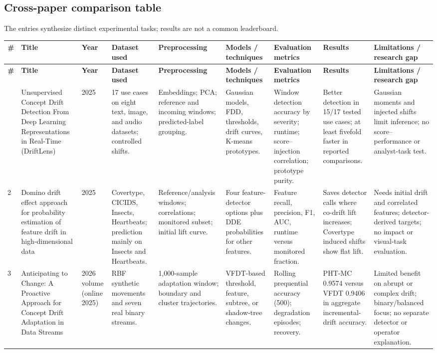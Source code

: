 \documentclass[10pt,a4paper]{article}
\renewcommand{\arraystretch}{1.1}
\begin{document}
\clearpage
\begin{landscape}
\section*{Cross-paper comparison table}
\noindent\footnotesize The entries synthesize distinct experimental tasks; results are not a common leaderboard.
\vspace{3pt}
\small
\renewcommand{\arraystretch}{1.1}
\begin{longtable}{L{0.45cm}L{3.05cm}L{1.15cm}L{2.95cm}L{3.05cm}L{2.95cm}L{2.95cm}L{3.0cm}L{3.95cm}}
\toprule
{}\textbf{\#} & \textbf{Title} & \textbf{Year} & \textbf{Dataset used} & \textbf{Preprocessing} & \textbf{Models / techniques} & \textbf{Evaluation metrics} & \textbf{Results} & \textbf{Limitations / research gap}\\
\midrule\endfirsthead
{}\textbf{\#} & \textbf{Title} & \textbf{Year} & \textbf{Dataset used} & \textbf{Preprocessing} & \textbf{Models / techniques} & \textbf{Evaluation metrics} & \textbf{Results} & \textbf{Limitations / research gap}\\
\midrule\endhead
\bottomrule{} & Unsupervised Concept Drift Detection From Deep Learning Representations in Real-Time (DriftLens) & 2025 & 17 use cases on eight text, image, and audio datasets; controlled shifts. & Embeddings; PCA; reference and incoming windows; predicted-label grouping. & Gaussian models, FDD, thresholds, drift curves, K-means prototypes. & Window detection accuracy by severity; runtime; score--injection correlation; prototype purity. & Better detection in 15/17 tested use cases; at least fivefold faster in reported comparisons. & Gaussian moments and injected shifts limit inference; no score--performance or analyst-task test.\\[5pt]
2 & Domino drift effect approach for probability estimation of feature drift in high-dimensional data & 2025 & Covertype, CICIDS, Insects, Heartbeats; prediction mainly on Insects and Heartbeats. & Reference/analysis windows; correlations; monitored subset; initial lift curve. & Four feature-detector options plus DDE probabilities for other features. & Feature recall, precision, F1, AUC, runtime versus monitored fraction. & Saves detector calls where co-drift lift increases; Covertype induced shifts show flat lift. & Needs initial drift and correlated features; detector-derived targets; no impact or visual-task evaluation.\\[5pt]
3 & Anticipating to Change: A Proactive Approach for Concept Drift Adaptation in Data Streams & 2026 volume (online 2025) & RBF synthetic movements and seven real binary streams. & 1,000-sample adaptation window; boundary and cluster trajectories. & VFDT-based threshold, feature, subtree, or shadow-tree changes. & Rolling prequential accuracy (500); degradation episodes; recovery. & PHT-MC 0.9574 versus VFDT 0.9406 in aggregate incremental-drift accuracy. & Limited benefit on abrupt or complex drift; binary/balanced focus; no separate detector or operator explanation.\\[5pt]

\end{longtable}
\end{landscape}
\end{document}
